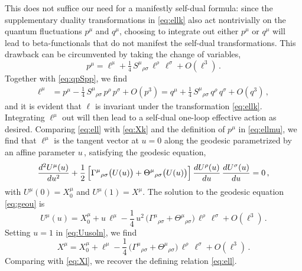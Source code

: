 \documentclass[11pt]{article}
\newcommand{\be}{\begin{equation}}
\newcommand{\ee}{\end{equation}}
\begin{document}
This does not suffice our need for a manifestly self-dual formula: since the supplementary duality transformations in \eqref{eq:ellk} also act nontrivially on the quantum fluctuations $p^\mu$ and $q^\mu$, choosing to integrate out either $p^\mu$ or $q^\mu$ will lead to beta-functionals that do not manifest the self-dual transformations.
This drawback can be circumvented by taking the change of variables,
%
\be \label{eq:ell}
	p^\mu = \ell^\mu + \tfrac{1}{4} \, S^\mu{}_{\rho\sigma} \, \ell^\rho \, \ell^\sigma + O(\ell^3)\,.
\ee
%
Together with \eqref{eq:qpSpp}, we find
%
\begin{align}
	\ell^\mu & = p^\mu - \tfrac{1}{4} \, S^\mu{}_{\rho\sigma} \, p^\rho \, p^\sigma + O(p^3)
	= q^\mu + \tfrac{1}{4} \, S^\mu{}_{\rho\sigma} \, q^\rho \, q^\sigma + O(q^3)\,,
\end{align}
%
and it is evident that $\ell$ is invariant under the transformation \eqref{eq:ellk}. Integrating $\ell^\mu$ out will then lead to a self-dual one-loop effective action as desired. Comparing \eqref{eq:ell} with \eqref{eq:Xk} and the definition of $p^\mu$ in \eqref{eq:ellmu}, we find that $\ell^\mu$ is the tangent vector at $u = 0$ along the geodesic parametrized by an affine parameter $u$\,, satisfying the geodesic equation,
%
\be \label{eq:geou}
	\frac{d^2 U^\mu(u)}{d u^2} + \frac{1}{2} \, \Bigl[ \Gamma^\mu{}_{\rho\sigma} \bigl(U(u)\bigr) + \Theta^\mu{}_{\rho\sigma} \bigl(U(u)\bigr) \Bigr] \, \frac{dU^\rho(u)}{du} \, \frac{dU^\sigma(u)}{du} = 0\,,
\ee
%
with $U^\mu(0) = X_0^\mu$ and $U^\mu(1) = X^\mu$. The solution to the geodesic equation \eqref{eq:geou} is
%
\be \label{eq:Uusoln}
	U^\mu (u) = X_0^\mu + u \, \ell^\mu - \frac{1}{4} \, u^2 \, \bigl( \Gamma^\mu{}_{\rho\sigma} + \Theta^\mu{}_{\rho\sigma} \bigr) \, \ell^\rho \, \ell^\sigma + O(\ell^3)\,.
\ee	
%
Setting $u = 1$ in \eqref{eq:Uusoln}, we find
%
\be
	X^\mu = X_0^\mu + \ell^\mu - \frac{1}{4} \, \bigl( \Gamma^\mu{}_{\rho\sigma} + \Theta^\mu{}_{\rho\sigma} \bigr) \, \ell^\rho \, \ell^\sigma + O(\ell^3)\,.
\ee	
%
Comparing with \eqref{eq:Xl}, we recover the defining relation \eqref{eq:ell}. 
\end{document}
